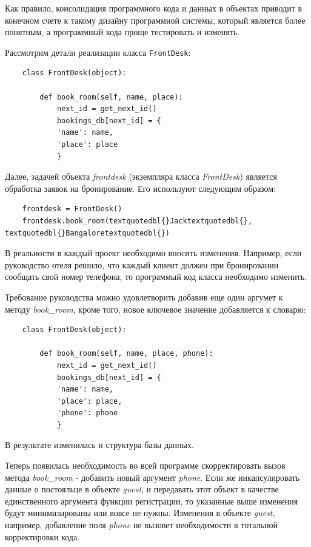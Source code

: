 \documentclass[a4paper,openany,twoside,draft]{book}
\providecommand*{\DUroletitlereference}[1]{\textsl{#1}}
\begin{document}
Как правило, консолидация программного кода и данных в объектах приводит в конечном счете к такому дизайну программной системы, который является более понятным, а программный кода проще тестировать и изменять.

Рассмотрим детали реализации класса \texttt{FrontDesk}:

\begin{verbatim}
    class FrontDesk(object):

        def book_room(self, name, place):
            next_id = get_next_id()
            bookings_db[next_id] = {
            'name': name,
            'place': place
            }
\end{verbatim}

Далее, задачей объекта \DUroletitlereference{frontdesk} (экземпляра класса \DUroletitlereference{FrontDesk}) является обработка заявок на бронирование.  Его используют следующим образом:

\begin{verbatim}
    frontdesk = FrontDesk()
    frontdesk.book_room(textquotedbl{}Jacktextquotedbl{}, textquotedbl{}Bangaloretextquotedbl{})
\end{verbatim}

В реальности в каждый проект необходимо вносить изменения.  Например, если руководство отеля решило, что каждый клиент должен при бронировании сообщать свой номер телефона, то программый код класса необходимо изменить.

Требование руководства можно удовлетворить добавив еще один аргумет к методу \DUroletitlereference{book\_room}, кроме того, новое ключевое значение добавляется к словарю:

\begin{verbatim}
    class FrontDesk(object):

        def book_room(self, name, place, phone):
            next_id = get_next_id()
            bookings_db[next_id] = {
            'name': name,
            'place': place,
            'phone': phone
            }
\end{verbatim}

В результате изменилась и структура базы данных.

Теперь появилась необходимость во всей программе скорректировать вызов метода \DUroletitlereference{book\_room} - добавить новый аргумент \DUroletitlereference{phone}.  Если же инкапсулировать данные о постояльце в объекте \DUroletitlereference{guest}, и передавать этот объект в качестве единственного аргумента функции регистрации, то указанные выше изменения будут минимизированы или вовсе не нужны.  Изменения в объекте \DUroletitlereference{guest}, например, добавление поля \DUroletitlereference{phone} не вызовет необходимости в тотальной корректировки кода.
\end{document}
